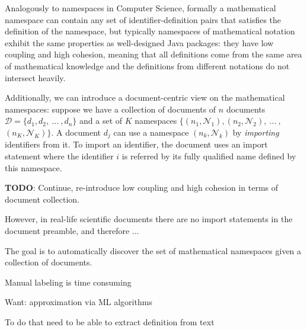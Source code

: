
Analogously to namespaces in Computer Science, formally a mathematical namespace
can contain any set of identifier-definition pairs that satisfies the definition of
the namespace, but typically namespaces of mathematical notation
exhibit the same properties as well-designed Java packages: they
have low coupling and high cohesion, meaning that all definitions
come from the same area of mathematical knowledge and the definitions
from different notations do not intersect heavily.

Additionally, we can introduce a document-centric view on the mathematical
namespaces: suppose we have a collection of documents of $n$ documents
$\mathcal D = \{ d_1, d_2, \ ... \ , d_n \}$ and a set of $K$ namespaces
$\{(n_1, \mathcal N_1), (n_2, \mathcal N_2), \ ... \ ,$ $(n_K, \mathcal N_K) \}$.
A document $d_j$ can use a namespace $(n_k, \mathcal N_k)$ by \emph{importing}
identifiers from it. To import an identifier, the document uses an import statement
where the identifier $i$ is referred by its fully qualified name
defined by this namespace.





\textbf{TODO}: Continue, re-introduce low coupling and high cohesion in terms of
document collection.


However, in real-life scientific documents there are no import statements in the document
preamble, and therefore ...

The goal is to automatically discover the set of mathematical namespaces
given a collection of documents.

Manual labeling is time consuming

Want: approximation via ML algorithms

To do that need to be able to extract definition from text




